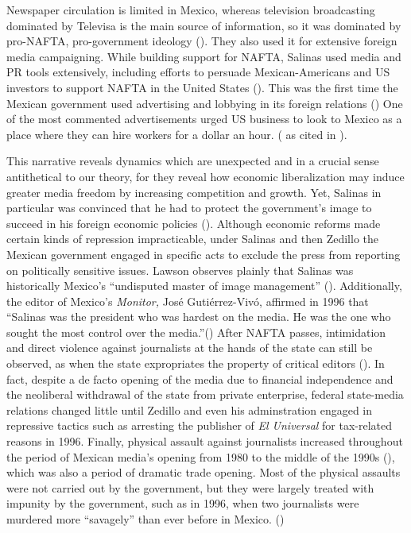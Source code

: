 \documentclass[12pt]{report}
\begin{document}
Newspaper circulation is limited in Mexico, whereas television broadcasting dominated by Televisa is
the main source of information, so it was dominated by pro-NAFTA, pro-government ideology
(\citealt{Hellman:1993wa}). They also used it for extensive foreign media campaigning. While
building support for NAFTA, Salinas used media and PR tools extensively, including efforts to
persuade Mexican-Americans and US investors to support NAFTA in the United States
(\citealt{Morris:2001iy}). This was the first time the Mexican government used advertising and
lobbying in its foreign relations (\citealt{Chabat:1997wj}) One of the most commented advertisements
urged US business to look to Mexico as a place where they can hire workers for a dollar an hour.
(\citealt[105]{center1993trading} as cited in \citealt[45]{Chabat:1997wj}).

This narrative reveals dynamics which are unexpected and in a crucial sense antithetical to our
theory, for they reveal how economic liberalization may induce greater media freedom by increasing
competition and growth. Yet, Salinas in particular was convinced that he had to protect the
government's image to succeed in his foreign economic policies (\citealt[107]{Dominguez:2009wd}).
Although economic reforms made certain kinds of repression impracticable, under Salinas and then
Zedillo the Mexican government engaged in specific acts to exclude the press from reporting on
politically sensitive issues. Lawson observes plainly that Salinas was historically Mexico's
``undisputed master of image management'' (\citealt[39]{lawson2002building}). Additionally, the
editor of Mexico's \emph{Monitor, }José Gutiérrez-Vivó, affirmed in 1996 that ``Salinas was the
president who was hardest on the media. He was the one who sought the most control over the
media.''(\citealt[39]{lawson2002building}) After NAFTA passes, intimidation and direct violence
against journalists at the hands of the state can still be observed, as when the state expropriates
the property of critical editors (\citealt{OrmeJr:1997da}). In fact, despite a de facto opening of
the media due to financial independence and the neoliberal withdrawal of the state from private
enterprise, federal state-media relations changed little until Zedillo and even his adminstration
engaged in repressive tactics such as arresting the publisher of \emph{El Universal} for tax-related
reasons in 1996. Finally, physical assault against journalists increased throughout the period of
Mexican media's opening from 1980 to the middle of the 1990s (\citealt[81]{lawson2002building}),
which was also a period of dramatic trade opening. Most of the physical assaults were not carried
out by the government, but they were largely treated with impunity by the government, such as in
1996, when two journalists were murdered more ``savagely'' than ever before in Mexico.
(\citealt{Anonymous:ex})
\end{document}
